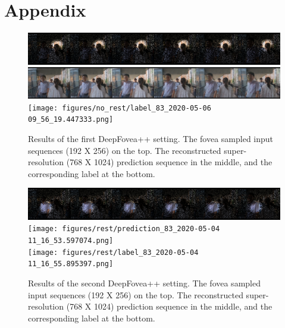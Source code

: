 \documentclass[10pt,twocolumn,letterpaper]{article}
\begin{document}
{\small
    
    
}

\section{Appendix}

\begin{figure}[h!]
    \centering
    \includegraphics[width=\columnwidth]{figures/no_rest/input_83_2020-05-06 09_56_21.383738.png}\\\vspace{-0.1cm}
    \includegraphics[width=\columnwidth]{figures/no_rest/prediction_83_2020-05-06 09_56_17.234900.png}\\\vspace{-0.1cm}
    \texttt{[image: figures/no\_rest/label\_83\_2020-05-06 09\_56\_19.447333.png]}\\
    \caption{Results of the first DeepFovea++ setting. The fovea sampled input sequences (192 X 256) on the top. The reconstructed super-resolution (768 X 1024) prediction sequence in the middle, and the corresponding label at the bottom.}
    \label{fig:norestresults1}
\end{figure}

\begin{figure}[h!]
    \centering
    \includegraphics[width=\columnwidth]{figures/rest/input_83_2020-05-04 11_16_57.840082.png}\\\vspace{-0.1cm}
    \texttt{[image: figures/rest/prediction\_83\_2020-05-04 11\_16\_53.597074.png]}\\\vspace{-0.1cm}
    \texttt{[image: figures/rest/label\_83\_2020-05-04 11\_16\_55.895397.png]}\\
    \caption{Results of the second DeepFovea++ setting. The fovea sampled input sequences (192 X 256) on the top. The reconstructed super-resolution (768 X 1024) prediction sequence in the middle, and the corresponding label at the bottom.}
    \label{fig:restresults1}
\end{figure}
\end{document}
